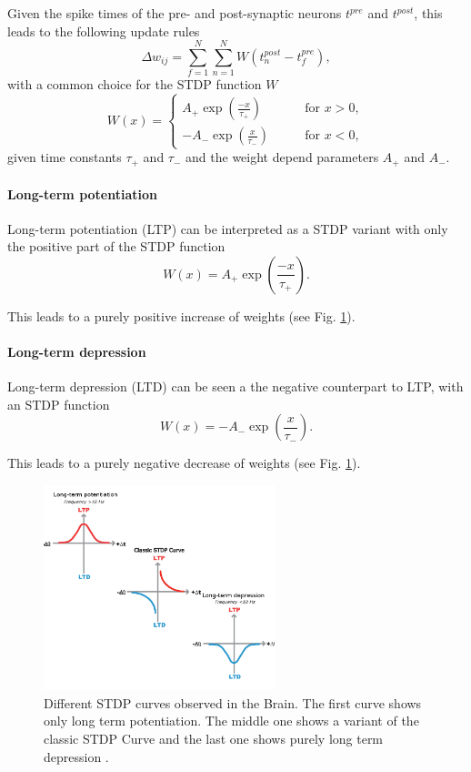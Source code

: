 Given the spike times of the pre- and post-synaptic neurons $t^{pre}$ and $t^{post}$, this leads to the following update rules \cite{gerstner2014neuronal}\cite{Sjostrom2010}
\[
\Delta w_{ij} = \sum_{f=1}^N \sum_{n=1}^N W(t^{post}_n - t^{pre}_f),
\]
with a common choice for the STDP function $W$
\[
W(x) =
\begin{cases}
A_+ \exp(\frac{-x}{\tau_+}) \quad \quad &\text{for  } x > 0,  \\
-A_- \exp(\frac{x}{\tau_-}) \quad \quad &\text{for  } x < 0,
\end{cases}
\]
given time constants $\tau_+$ and $\tau_-$ and the weight depend parameters $A_+$ and $A_-$.
     

\paragraph{Long-term potentiation} \label{c:ltp}
 
Long-term potentiation (LTP) can be interpreted as a STDP variant with only the positive part of the STDP function
\[
W(x) =  A_+ \exp(\frac{-x}{\tau_+}).
\]

This leads to a purely positive increase of weights (see Fig. \ref{fig:stdp}).

\paragraph{Long-term depression} \label{c:ldp}

Long-term depression (LTD) can be seen a the negative counterpart to LTP, with an STDP function
\[
W(x) =  -A_- \exp(\frac{x}{\tau_-}).
\]

This leads to a purely negative decrease of weights (see Fig. \ref{fig:stdp}).

\begin{figure}
	\centering
    	\includegraphics[width=0.6\textwidth]{imgs/stdp_curves.jpg} 
    \caption[STDP curves observed in the Brain.]{Different STDP curves observed in the Brain. The first curve shows only long term potentiation. The middle one shows a variant of the classic STDP Curve and the last one shows purely long term depression \cite{Buchanan2010}.}
	\label{fig:stdp}
\end{figure}